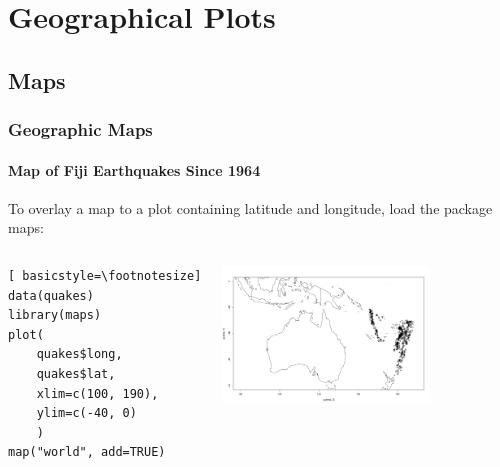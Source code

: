 

\section[Geographical Plots]{Geographical Plots}
\subsection{Maps}

\begin{frame}[fragile]
\frametitle{Geographic Maps}
  \framesubtitle{Map of Fiji Earthquakes Since 1964}

To overlay a map to a plot containing latitude and longitude, load the package \ttfamily maps: \normalfont 
    \begin{columns}
\begin{lstlisting}[ basicstyle=\footnotesize]
data(quakes)
library(maps)
plot(
	quakes$long, 
	quakes$lat, 
	xlim=c(100, 190), 
	ylim=c(-40, 0)
	)
map("world", add=TRUE)
\end{lstlisting}

       \begin{center}
\includegraphics[width = 55mm]{images/Fuji.pdf}
\end{center}
\end{columns}
\end{frame}

